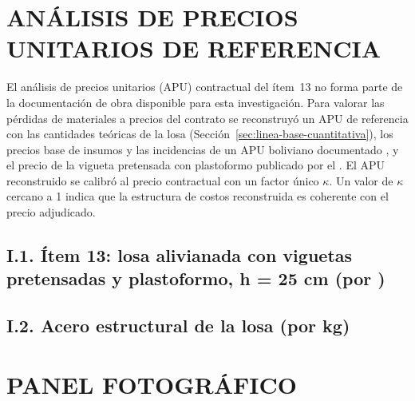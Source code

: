 \chapter{ANÁLISIS DE PRECIOS UNITARIOS DE REFERENCIA}
\label{anx:apu}
El análisis de precios unitarios (APU) contractual del ítem~13 no forma parte de la documentación de obra disponible para esta investigación. Para valorar las pérdidas de materiales a precios del contrato se reconstruyó un APU de referencia con las cantidades teóricas de la losa (Sección~\ref{sec:linea-base-cuantitativa}), los precios base de insumos y las incidencias de un APU boliviano documentado \parencite{cocarico2022}, y el precio de la vigueta pretensada con plastoformo publicado por el \textcite{ine2026precios}. El APU reconstruido se calibró al precio contractual con un factor único $\kappa$. Un valor de $\kappa$ cercano a 1 indica que la estructura de costos reconstruida es coherente con el precio adjudicado.

\section*{I.1. Ítem 13: losa alivianada con viguetas pretensadas y plastoformo, h = 25 cm (por \mdos{})}
{\small{}}

\section*{I.2. Acero estructural de la losa (por kg)}
{\small{}}

\chapter{PANEL FOTOGRÁFICO}


